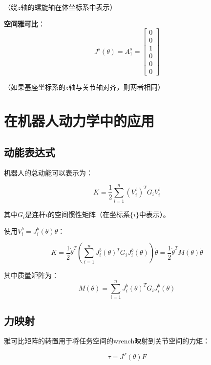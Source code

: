 \documentclass[12pt,a4paper]{article}
\begin{document}
（绕$z$轴的螺旋轴在体坐标系中表示）

\textbf{空间雅可比}：
\begin{equation}
J^s(\theta) = A_1^s = \begin{bmatrix} 0 \\ 0 \\ 1 \\ 0 \\ 0 \\ 0 \end{bmatrix}
\end{equation}

（如果基座坐标系的$z$轴与关节轴对齐，则两者相同）

\section{在机器人动力学中的应用}

\subsection{动能表达式}

机器人的总动能可以表示为：

\begin{equation}
K = \frac{1}{2}\sum_{i=1}^{n} (V_i^b)^T G_i V_i^b
\end{equation}

其中$G_i$是连杆$i$的空间惯性矩阵（在坐标系$\{i\}$中表示）。

使用$V_i^b = J_i^b(\theta) \dot{\theta}$：

\begin{equation}
K = \frac{1}{2}\dot{\theta}^T \left(\sum_{i=1}^{n} J_i^b(\theta)^T G_i J_i^b(\theta)\right) \dot{\theta} = \frac{1}{2}\dot{\theta}^T M(\theta) \dot{\theta}
\end{equation}

其中质量矩阵为：
\begin{equation}
M(\theta) = \sum_{i=1}^{n} J_i^b(\theta)^T G_i J_i^b(\theta)
\label{eq:mass_matrix}
\end{equation}

\subsection{力映射}

雅可比矩阵的转置用于将任务空间的wrench映射到关节空间的力矩：

\begin{equation}
\tau = J^T(\theta) F
\label{eq:force_mapping}
\end{equation}
\end{document}
